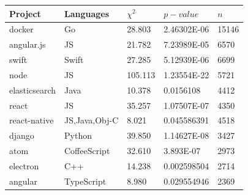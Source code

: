 \begin{table}[!t]
         \begin{tabular} {  l | l | l | l | l}
         \textbf{Project}        &       \textbf{Languages}             &       $\chi^2$        &       $p-value$                       &       $n$             \\ \hline
                 docker                  &       Go                             &       28.803                  &       2.46302E-06             &       15146           \\
                 angular.js              &       \ac{JS}                         &       21.782                  &       7.23989E-05             &       6570            \\
                 swift                   &       Swift                          &       27.285                  &       5.12939E-06             &       6699            \\
                 node                    &       \ac{JS}            &       105.113                 &       1.23554E-22             &       5721            \\
                 elasticsearch           &       Java                           &       10.378                  &       0.0156108               &       4412            \\
                 react                   &       \ac{JS}                          &       35.257                  &       1.07507E-07             &       4350            \\
                 react-native            &       \ac{JS},Java,Obj-C         &       8.021                   &       0.045586391             &       4518            \\
                 django                  &       Python                         &       39.850                  &       1.14627E-08             &       3427            \\
                 atom                    &       CoffeeScript                   &       32.610                  &       3.893E-07               &       2973            \\
                 electron                &       C++                            &       14.238                  &       0.002598504             &       2714            \\
                 angular                 &       TypeScript                     &       8.980                   &       0.029554946             &       2369            \\

\end{tabular}
\end{table}
